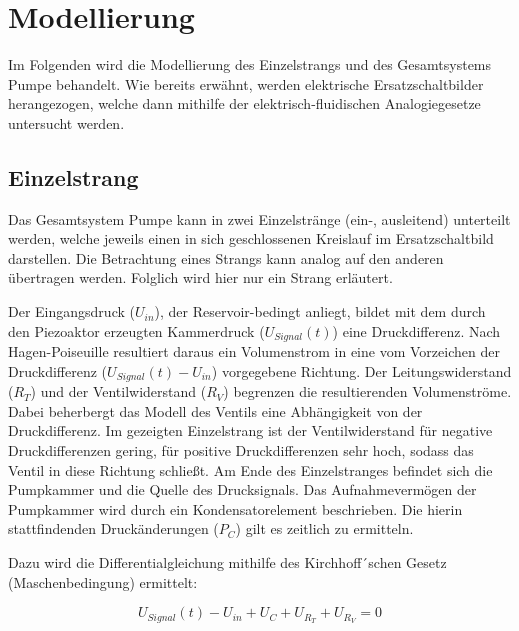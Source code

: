 \documentclass[fontsize=12pt, a4paper]{scrartcl}
\let\stdsection\section 	%
\renewcommand\section{\newpage\stdsection}
\begin{document}
\section{Modellierung}

Im Folgenden wird die Modellierung des Einzelstrangs und des Gesamtsystems Pumpe behandelt.
Wie bereits erwähnt, werden elektrische Ersatzschaltbilder herangezogen, welche dann mithilfe der elektrisch-fluidischen Analogiegesetze untersucht werden.

\subsection{Einzelstrang}

Das Gesamtsystem Pumpe kann in zwei Einzelstränge (ein-, ausleitend) unterteilt werden, welche jeweils einen in sich geschlossenen Kreislauf im Ersatzschaltbild darstellen.
Die Betrachtung eines Strangs kann analog auf den anderen übertragen werden. Folglich wird hier nur ein Strang erläutert.

\begin{center}
	
\end{center}

Der Eingangsdruck ($U_{in}$), der Reservoir-bedingt anliegt, bildet mit dem durch den Piezoaktor erzeugten Kammerdruck ($U_{Signal}(t)$) eine Druckdifferenz. Nach Hagen-Poiseuille resultiert daraus ein Volumenstrom in eine vom Vorzeichen der Druckdifferenz ($U_{Signal}(t)-U_{in}$) vorgegebene Richtung. Der Leitungswiderstand ($R_{T}$) und der Ventilwiderstand ($R_{V}$) begrenzen die resultierenden Volumenströme. Dabei beherbergt das Modell des Ventils eine Abhängigkeit von der Druckdifferenz. Im gezeigten Einzelstrang ist der Ventilwiderstand für negative Druckdifferenzen gering, für positive Druckdifferenzen sehr hoch, sodass das Ventil in diese Richtung schließt. Am Ende des Einzelstranges befindet sich die Pumpkammer und die Quelle des Drucksignals. Das Aufnahmevermögen der Pumpkammer wird durch ein Kondensatorelement beschrieben. Die hierin stattfindenden Druckänderungen ($P_{C}$) gilt es zeitlich zu ermitteln.

Dazu wird die Differentialgleichung mithilfe des Kirchhoff´schen Gesetz (Maschenbedingung) ermittelt:

\begin{equation}
	U_{Signal}(t) - U_{in} + U_{C} + U_{R_{T}} + U_{R_{V}} = 0
\end{equation}
\end{document}
